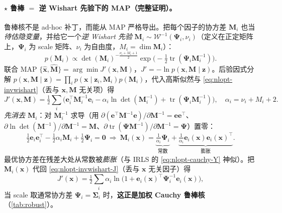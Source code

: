 \paragraph{$\star$ 鲁棒 $=$ 逆 Wishart 先验下的 MAP（完整证明）。}\cite{barfoot2024state}
鲁棒核不是 ad-hoc 补丁，而能从 MAP 严格导出。把每个因子的协方差 $\mathbf{M}_i$ 也当\emph{待估隐变量}，并给它一个\emph{逆 Wishart 先验} $\mathbf{M}_i\sim\mathcal{W}^{-1}(\boldsymbol{\Psi}_i,\nu_i)$（定义在正定矩阵上，$\boldsymbol{\Psi}_i$ 为 scale 矩阵、$\nu_i$ 为自由度，$M_i=\dim\mathbf{M}_i$）：
\begin{equation}
  p(\mathbf{M}_i)\propto\det(\mathbf{M}_i)^{-\frac{\nu_i+M_i+1}{2}}\exp\!\Big(-\tfrac12\operatorname{tr}(\boldsymbol{\Psi}_i\mathbf{M}_i^{-1})\Big).
  \label{eq:nlopt-invwishart}
\end{equation}
联合 MAP $\{\hat{\mathbf{x}},\hat{\mathbf{M}}\}=\arg\min J'(\mathbf{x},\mathbf{M})$，$J'=-\ln p(\mathbf{x},\mathbf{M}\mid\mathbf{z})$。后验因式分解 $p(\mathbf{x},\mathbf{M}\mid\mathbf{z})=\prod_i p(\mathbf{x}\mid\mathbf{z}_i,\mathbf{M}_i)p(\mathbf{M}_i)$，代入高斯似然与 \cref{eq:nlopt-invwishart}（丢与 $\mathbf{x},\mathbf{M}$ 无关项）得
\begin{equation}
  J'(\mathbf{x},\mathbf{M})=\tfrac12\sum_i\Big(\mathbf{e}_i^\top\mathbf{M}_i^{-1}\mathbf{e}_i-\alpha_i\ln\det(\mathbf{M}_i^{-1})+\operatorname{tr}(\boldsymbol{\Psi}_i\mathbf{M}_i^{-1})\Big),\quad \alpha_i=\nu_i+M_i+2.
  \label{eq:nlopt-invwishart-J}
\end{equation}
\emph{先消去 $\mathbf{M}_i$}：对 $\mathbf{M}_i^{-1}$ 求导（用 $\partial(\mathbf{e}^\top\mathbf{M}^{-1}\mathbf{e})/\partial\mathbf{M}^{-1}=\mathbf{e}\mathbf{e}^\top$、$\partial\ln\det(\mathbf{M}^{-1})/\partial\mathbf{M}^{-1}=\mathbf{M}$、$\partial\operatorname{tr}(\boldsymbol{\Psi}\mathbf{M}^{-1})/\partial\mathbf{M}^{-1}=\boldsymbol{\Psi}$）置零：
\begin{equation}
  \tfrac12\mathbf{e}_i\mathbf{e}_i^\top-\tfrac12\alpha_i\mathbf{M}_i+\tfrac12\boldsymbol{\Psi}_i=\mathbf{0}
  \ \Rightarrow\ \mathbf{M}_i(\mathbf{x})=\underbrace{\tfrac1{\alpha_i}\boldsymbol{\Psi}_i}_{\text{常数}}+\underbrace{\tfrac1{\alpha_i}\mathbf{e}_i(\mathbf{x})\mathbf{e}_i(\mathbf{x})^\top}_{\text{膨胀}}.
  \label{eq:nlopt-invwishart-M}
\end{equation}
最优协方差在残差大处从常数被\emph{膨胀}（与 IRLS 的 \cref{eq:nlopt-cauchy-Y} 神似）。把 $\mathbf{M}_i(\mathbf{x})$ 代回 \cref{eq:nlopt-invwishart-J}（丢与 $\mathbf{x}$ 无关因子）得
\begin{equation}
  J'(\mathbf{x})=\tfrac12\sum_i\alpha_i\ln\!\big(1+\mathbf{e}_i(\mathbf{x})^\top\boldsymbol{\Psi}_i^{-1}\mathbf{e}_i(\mathbf{x})\big),
  \label{eq:nlopt-robust-cauchy}
\end{equation}
当 scale 取通常协方差 $\boldsymbol{\Psi}_i=\boldsymbol{\Sigma}_i$ 时，\textbf{这正是加权 Cauchy 鲁棒核}（\cref{tab:robust}）。

